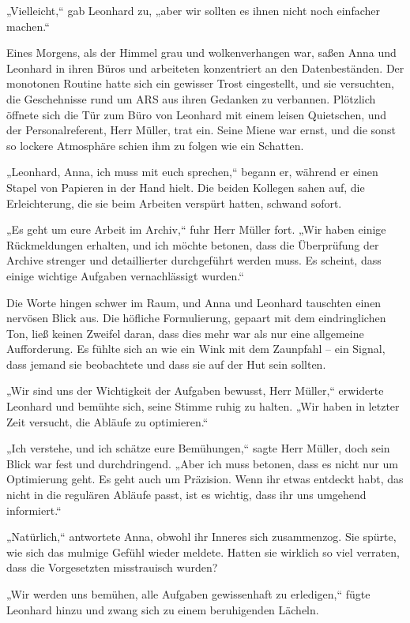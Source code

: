 \documentclass[
]{article}
\begin{document}
„Vielleicht,`` gab Leonhard zu, „aber wir sollten es ihnen nicht noch
einfacher machen.``

Eines Morgens, als der Himmel grau und wolkenverhangen war, saßen Anna
und Leonhard in ihren Büros und arbeiteten konzentriert an den
Datenbeständen. Der monotonen Routine hatte sich ein gewisser Trost
eingestellt, und sie versuchten, die Geschehnisse rund um ARS aus ihren
Gedanken zu verbannen. Plötzlich öffnete sich die Tür zum Büro von
Leonhard mit einem leisen Quietschen, und der Personalreferent, Herr
Müller, trat ein. Seine Miene war ernst, und die sonst so lockere
Atmosphäre schien ihm zu folgen wie ein Schatten.

„Leonhard, Anna, ich muss mit euch sprechen,`` begann er, während er
einen Stapel von Papieren in der Hand hielt. Die beiden Kollegen sahen
auf, die Erleichterung, die sie beim Arbeiten verspürt hatten, schwand
sofort.

„Es geht um eure Arbeit im Archiv,`` fuhr Herr Müller fort. „Wir haben
einige Rückmeldungen erhalten, und ich möchte betonen, dass die
Überprüfung der Archive strenger und detaillierter durchgeführt werden
muss. Es scheint, dass einige wichtige Aufgaben vernachlässigt wurden.``

Die Worte hingen schwer im Raum, und Anna und Leonhard tauschten einen
nervösen Blick aus. Die höfliche Formulierung, gepaart mit dem
eindringlichen Ton, ließ keinen Zweifel daran, dass dies mehr war als
nur eine allgemeine Aufforderung. Es fühlte sich an wie ein Wink mit dem
Zaunpfahl -- ein Signal, dass jemand sie beobachtete und dass sie auf
der Hut sein sollten.

„Wir sind uns der Wichtigkeit der Aufgaben bewusst, Herr Müller,``
erwiderte Leonhard und bemühte sich, seine Stimme ruhig zu halten. „Wir
haben in letzter Zeit versucht, die Abläufe zu optimieren.``

„Ich verstehe, und ich schätze eure Bemühungen,`` sagte Herr Müller,
doch sein Blick war fest und durchdringend. „Aber ich muss betonen, dass
es nicht nur um Optimierung geht. Es geht auch um Präzision. Wenn ihr
etwas entdeckt habt, das nicht in die regulären Abläufe passt, ist es
wichtig, dass ihr uns umgehend informiert.``

„Natürlich,`` antwortete Anna, obwohl ihr Inneres sich zusammenzog. Sie
spürte, wie sich das mulmige Gefühl wieder meldete. Hatten sie wirklich
so viel verraten, dass die Vorgesetzten misstrauisch wurden?

„Wir werden uns bemühen, alle Aufgaben gewissenhaft zu erledigen,``
fügte Leonhard hinzu und zwang sich zu einem beruhigenden Lächeln.
\end{document}
